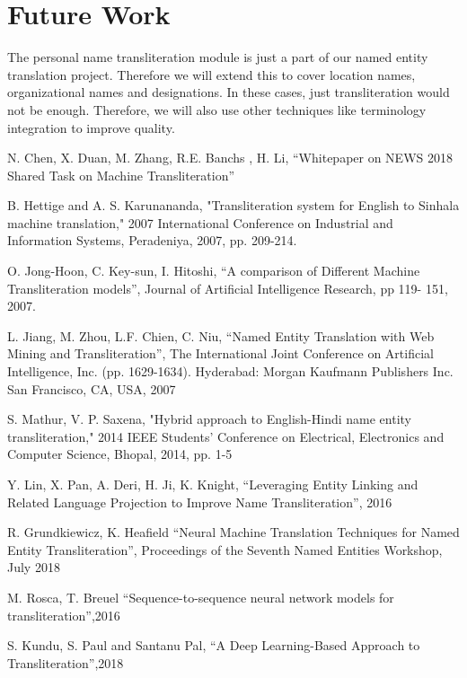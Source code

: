\documentclass[10pt, a4paper, conference, compsocconf]{IEEEtran}
\begin{document}
\section{Future Work }		
The personal name transliteration module is just a part of our named entity translation project. Therefore we will extend this to cover location names, organizational names and designations. In these cases, just transliteration would not be enough. Therefore, we will also use other techniques like terminology integration to improve quality.




\begin{thebibliography}{1}
  
N. Chen, X. Duan, M. Zhang, R.E. Banchs , H. Li, “Whitepaper on NEWS 2018 Shared Task on Machine Transliteration”

B. Hettige and A. S. Karunananda, "Transliteration system for English to Sinhala machine translation," 2007 International Conference on Industrial and Information Systems, Peradeniya, 2007, pp. 209-214.

O. Jong-Hoon, C. Key-sun, I. Hitoshi, “A comparison of Different Machine Transliteration models”, Journal of Artificial Intelligence Research, pp 119- 151, 2007.

L. Jiang, M. Zhou, L.F. Chien, C. Niu, “Named Entity Translation with Web Mining and Transliteration”, The International Joint Conference on Artificial Intelligence, Inc. (pp. 1629-1634). Hyderabad: Morgan Kaufmann Publishers Inc. San Francisco, CA, USA, 2007

S. Mathur, V. P. Saxena, "Hybrid approach to English-Hindi name entity transliteration," 2014 IEEE Students' Conference on Electrical, Electronics and Computer Science, Bhopal, 2014, pp. 1-5 	

Y. Lin, X. Pan, A. Deri, H. Ji, K. Knight, “Leveraging Entity Linking and Related Language Projection to Improve Name Transliteration”, 2016

R. Grundkiewicz, K. Heafield “Neural Machine Translation Techniques for Named Entity Transliteration”, Proceedings of the Seventh Named Entities Workshop, July 2018
  
M. Rosca, T. Breuel “Sequence-to-sequence neural network models for transliteration”,2016

S. Kundu, S. Paul and Santanu Pal, “A Deep Learning-Based Approach to Transliteration”,2018


\end{thebibliography}
\end{document}
